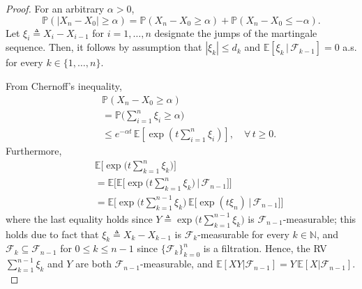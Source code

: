 \documentclass[12pt, oneside, a4paper]{article}
\theoremstyle{plain}
\theoremstyle{definition}
\def\naturals{\mathbb{N}}
\def\pr{\ensuremath{\mathbb{P}}}
\def\expectation{\ensuremath{\mathbb{E}}}
\begin{document}
\begin{proof}
For an arbitrary $\alpha > 0$,
\begin{equation}
\pr(|X_n - X_0| \geq \alpha) = \pr(X_n - X_0 \geq \alpha) + \pr(X_n - X_0 \leq -\alpha).
\label{eq: union of disjoint events}
\end{equation}
Let $\xi_i \triangleq X_i - X_{i-1}$ for $i=1, \ldots, n$ designate
the jumps of the martingale sequence. Then, it follows by assumption that
$|\xi_k| \leq d_k$ and $\expectation[\xi_k \, | \, \mathcal{F}_{k-1}] = 0$
a.s. for every $k \in \{1, \ldots, n\}$.

From Chernoff's inequality,
\begin{eqnarray}
&& \pr(X_n - X_0 \geq \alpha) \nonumber \\
&& = \pr \Biggl(\sum_{i=1}^n \xi_i \geq \alpha \Biggr) \nonumber \\
&& \leq e^{-\alpha t} \, \expectation\left[\exp \left(t \sum_{i=1}^n \xi_i \right) \right],
\quad \forall \, t \geq 0.
\label{eq: Chernoff's inequality}
\end{eqnarray}
Furthermore,
\begin{align}\label{eq: smoothing theorem}
&& \expectation \biggl[ \exp \biggl(t \sum_{k=1}^n \xi_k \biggr)
\biggr] \nonumber \\
&& = \expectation \Biggl[ \expectation \biggl[ \exp \biggl(t
\sum_{k=1}^n \xi_k \biggr) \, | \, \mathcal{F}_{n-1} \biggr] \Biggr]
\nonumber \\
&& = \expectation \Biggl[ \exp \biggl(t \sum_{k=1}^{n-1} \xi_k
\biggr) \, \expectation \bigl[ \exp(t \xi_n) \, | \,
\mathcal{F}_{n-1} \bigr] \Biggr]
\end{align}
where the last equality holds since $Y \triangleq \exp \bigl(t
\sum_{k=1}^{n-1} \xi_k \bigr)$ is $\mathcal{F}_{n-1}$-measurable;
this holds due to fact that $\xi_k \triangleq X_k
- X_{k-1}$ is $\mathcal{F}_k$-measurable for every $k \in
\naturals$, and $\mathcal{F}_k \subseteq \mathcal{F}_{n-1}$ for $0
\leq k \leq n-1$ since $\{\mathcal{F}_k\}_{k=0}^{n}$ is a
filtration. Hence, the RV $\sum_{k=1}^{n-1} \xi_k$ and $Y$
are both $\mathcal{F}_{n-1}$-measurable, and
$\expectation[ XY | \mathcal{F}_{n-1}] =
Y \, \expectation[ X | \mathcal{F}_{n-1}].$


\end{proof}
\end{document}
